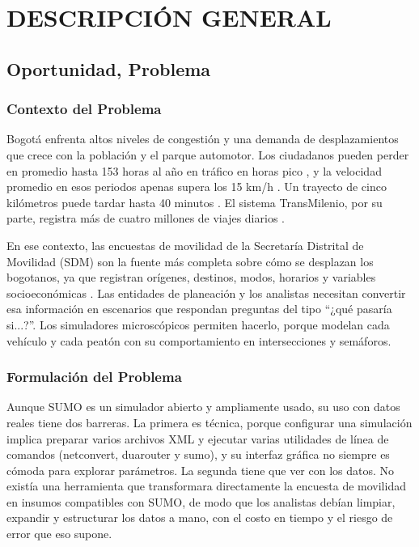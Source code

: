 \setcounter{subsection}{0}
\section{DESCRIPCIÓN GENERAL}

\subsection{Oportunidad, Problema}

\subsubsection{Contexto del Problema}

Bogotá enfrenta altos niveles de congestión y una demanda de desplazamientos que crece con la población y el parque automotor. Los ciudadanos pueden perder en promedio hasta 153 horas al año en tráfico en horas pico \cite{eltiempo}, y la velocidad promedio en esos periodos apenas supera los 15 km/h \cite{portafolio2025}. Un trayecto de cinco kilómetros puede tardar hasta 40 minutos \cite{infobae}. El sistema TransMilenio, por su parte, registra más de cuatro millones de viajes diarios \cite{alcaldia}.

En ese contexto, las encuestas de movilidad de la Secretaría Distrital de Movilidad (SDM) son la fuente más completa sobre cómo se desplazan los bogotanos, ya que registran orígenes, destinos, modos, horarios y variables socioeconómicas \cite{portafolio2023,sdm_encuesta_movilidad_2023}. Las entidades de planeación y los analistas necesitan convertir esa información en escenarios que respondan preguntas del tipo “¿qué pasaría si...?”. Los simuladores microscópicos permiten hacerlo, porque modelan cada vehículo y cada peatón con su comportamiento en intersecciones y semáforos.

\subsubsection{Formulación del Problema}

Aunque SUMO es un simulador abierto y ampliamente usado, su uso con datos reales tiene dos barreras. La primera es técnica, porque configurar una simulación implica preparar varios archivos XML y ejecutar varias utilidades de línea de comandos (netconvert, duarouter y sumo), y su interfaz gráfica no siempre es cómoda para explorar parámetros. La segunda tiene que ver con los datos. No existía una herramienta que transformara directamente la encuesta de movilidad en insumos compatibles con SUMO, de modo que los analistas debían limpiar, expandir y estructurar los datos a mano, con el costo en tiempo y el riesgo de error que eso supone.

